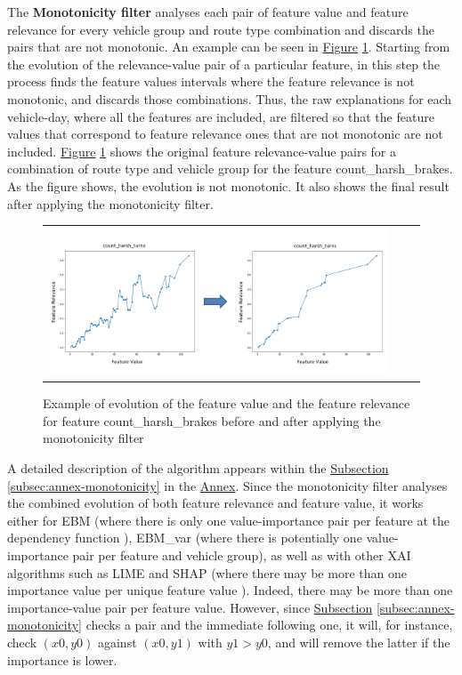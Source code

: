 The \textbf{Monotonicity filter} analyses each pair of feature value and feature relevance for every vehicle group and route type combination and discards the pairs that are not monotonic. An example can be seen in \hyperref[fig:ch6-monotonicity-filter-example]{Figure} \ref{fig:ch6-monotonicity-filter-example}.
Starting from the evolution of the relevance-value pair of a particular feature, in this step the process finds the feature values intervals where the feature relevance is not monotonic, and discards those combinations. Thus, the raw explanations for each vehicle-day, where all the features are included, are filtered so that the feature values that correspond to feature relevance ones that are not monotonic are not included. 
\hyperref[fig:ch6-monotonicity-filter-example]{Figure} \ref{fig:ch6-monotonicity-filter-example} shows the original feature relevance-value pairs for a combination of route type and vehicle group for the feature count\_harsh\_brakes. As the figure shows, the evolution is not monotonic. It also shows the final result after applying the monotonicity filter.

\begin{figure}[h!]
\centering
 \begin{tabular}{c@{\qquad}c@{\qquad}c}
\includegraphics[width=350pt]{figures/chapter6_LucaFleet/MonotonicFilterExample.PNG}
  \end{tabular} 
  \caption{Example of evolution of the feature value and the feature relevance for feature count\_harsh\_brakes before and after applying the monotonicity filter\label{fig:ch6-monotonicity-filter-example}}
\end{figure}

A detailed description of the algorithm appears within the \hyperref[subsec:annex-monotonicity]{Subsection} \ref{subsec:annex-monotonicity} in the \hyperref[ch:annex]{Annex}. Since the monotonicity filter analyses the combined evolution of both feature relevance and feature value, it works either for EBM (where there is only one value-importance pair per feature at the dependency function \parencite{nori2019interpretml}), EBM\_var (where there is potentially one value-importance pair per feature and vehicle group), as well as with other XAI algorithms such as LIME and SHAP (where there may be more than one importance value per unique feature value \parencite{molnar2019interpretable}). Indeed, there may be more than one importance-value pair per feature value. However, since \hyperref[subsec:annex-monotonicity]{Subsection} \ref{subsec:annex-monotonicity} checks a pair and the immediate following one, it will, for instance, check $(x0,y0)$ against $(x0, y1)$ with $y1 > y0$, and will remove the latter if the importance is lower.

